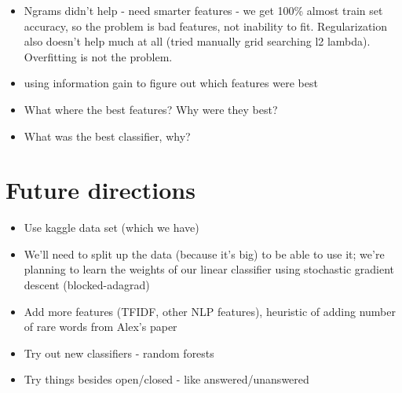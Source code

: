 \documentclass[11pt]{article}
\begin{document}
\begin{itemize}
  \item Ngrams didn’t help - need smarter features - we get 100\%
    almost train set accuracy, so the problem is bad features, not
    inability to fit. Regularization also doesn’t help much at all
    (tried manually grid searching l2 lambda). Overfitting is not the
    problem.
  \item using information gain to figure out which features were best
  \item What where the best features? Why were they best?
  \item What was the best classifier, why?
\end{itemize}

\section{Future directions}
\begin{itemize}
\item Use kaggle data set (which we have)
\item We’ll need to split up the data (because it’s big) to be able to use it; we’re planning to learn the weights of our linear classifier using stochastic gradient descent (blocked-adagrad)
\item Add more features (TFIDF, other NLP features), heuristic of adding number of rare words from Alex’s paper
\item Try out new classifiers - random forests
\item Try things besides open/closed - like answered/unanswered
\end{itemize}

{}

\end{document}
